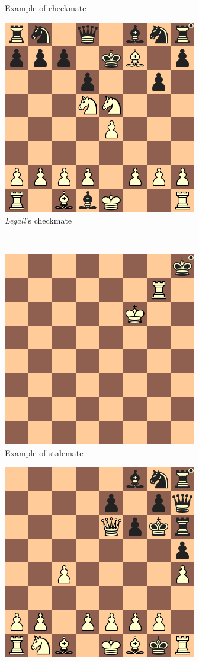 \begin{figure}
\begin{subfigure}[b]{0.4\textwidth}
        \caption{Example of checkmate}
        \label{fig:mate1}
    \end{subfigure}
    \qquad
    \begin{subfigure}[b]{0.4\textwidth}
         \includegraphics[scale=0.5]{fig/rules/mate_2}
        \caption{\textit{Legall}'s checkmate}
        \label{fig:mate2}
    \end{subfigure}
    \\
    \begin{subfigure}[b]{0.4\textwidth}
            \includegraphics[scale=0.5]{fig/rules/stalemate1}
            \caption{Example of stalemate}
            \label{fig:stalemate1}
        \end{subfigure}
        \qquad
        \begin{subfigure}[b]{0.4\textwidth}
             \includegraphics[scale=0.5]{fig/rules/stalemate2}

\end{subfigure}
\end{figure}
